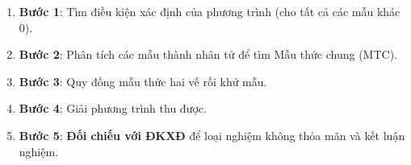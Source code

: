 \begin{enumerate}
\item \textbf{Bước 1}: Tìm điều kiện xác định của phương trình (cho tất cả các mẫu khác $0$).
\item \textbf{Bước 2}: Phân tích các mẫu thành nhân tử để tìm Mẫu thức chung (MTC).
\item \textbf{Bước 3}: Quy đồng mẫu thức hai vế rồi khử mẫu.
\item \textbf{Bước 4}: Giải phương trình thu được.
\item \textbf{Bước 5}: \textbf{Đối chiếu với ĐKXĐ} để loại nghiệm không thỏa mãn và kết luận nghiệm.
\end{enumerate}
